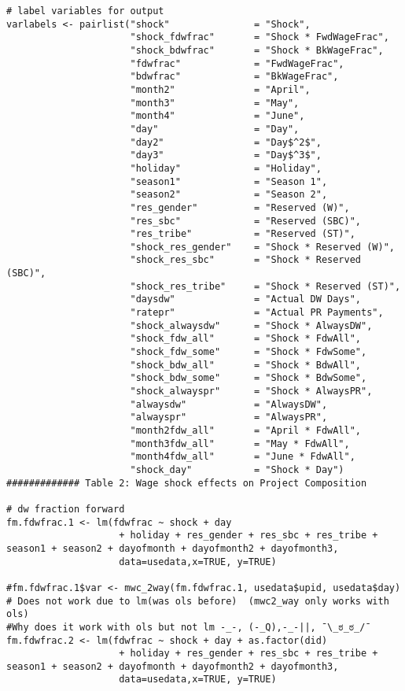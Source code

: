 \documentclass{article}
\begin{document}
\begin{verbatim}
# label variables for output              
varlabels <- pairlist("shock"               = "Shock",
                      "shock_fdwfrac"       = "Shock * FwdWageFrac",
                      "shock_bdwfrac"       = "Shock * BkWageFrac",
                      "fdwfrac"             = "FwdWageFrac",
                      "bdwfrac"             = "BkWageFrac",
                      "month2"              = "April",
                      "month3"              = "May",
                      "month4"              = "June",
                      "day"                 = "Day",
                      "day2"                = "Day$^2$",
                      "day3"                = "Day$^3$",
                      "holiday"             = "Holiday",
                      "season1"             = "Season 1",
                      "season2"             = "Season 2",
                      "res_gender"          = "Reserved (W)",
                      "res_sbc"             = "Reserved (SBC)",
                      "res_tribe"           = "Reserved (ST)",
                      "shock_res_gender"    = "Shock * Reserved (W)",
                      "shock_res_sbc"       = "Shock * Reserved (SBC)",
                      "shock_res_tribe"     = "Shock * Reserved (ST)",
                      "daysdw"              = "Actual DW Days",
                      "ratepr"              = "Actual PR Payments",
                      "shock_alwaysdw"      = "Shock * AlwaysDW",
                      "shock_fdw_all"       = "Shock * FdwAll",
                      "shock_fdw_some"      = "Shock * FdwSome",
                      "shock_bdw_all"       = "Shock * BdwAll",
                      "shock_bdw_some"      = "Shock * BdwSome",
                      "shock_alwayspr"      = "Shock * AlwaysPR",
                      "alwaysdw"            = "AlwaysDW",
                      "alwayspr"            = "AlwaysPR",
                      "month2fdw_all"       = "April * FdwAll",
                      "month3fdw_all"       = "May * FdwAll",
                      "month4fdw_all"       = "June * FdwAll",
                      "shock_day"           = "Shock * Day")
############# Table 2: Wage shock effects on Project Composition

# dw fraction forward
fm.fdwfrac.1 <- lm(fdwfrac ~ shock + day
                    + holiday + res_gender + res_sbc + res_tribe + season1 + season2 + dayofmonth + dayofmonth2 + dayofmonth3, 
                    data=usedata,x=TRUE, y=TRUE)

#fm.fdwfrac.1$var <- mwc_2way(fm.fdwfrac.1, usedata$upid, usedata$day) 
# Does not work due to lm(was ols before)  (mwc2_way only works with ols)
#Why does it work with ols but not lm -_-, (-_Q),-_-||, ¯\_ಠ_ಠ_/¯
fm.fdwfrac.2 <- lm(fdwfrac ~ shock + day + as.factor(did)
                    + holiday + res_gender + res_sbc + res_tribe + season1 + season2 + dayofmonth + dayofmonth2 + dayofmonth3, 
                    data=usedata,x=TRUE, y=TRUE)


\end{verbatim}
\end{document}
